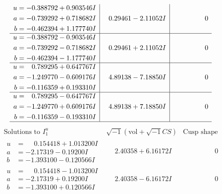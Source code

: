 \documentclass[1p]{elsarticle_modified}
\theoremstyle{definition}
\newcommand{\I}{\sqrt{-1}}
\begin{document}
$$\begin{array}{c|c|c}
\begin{aligned}
u &= -0.388792 + 0.903546 I \\
a &= -0.739292 + 0.718682 I \\
b &= -0.462394 + 1.177740 I\end{aligned}
 & \phantom{-}0.29461 - 2.11052 I & \phantom{-0.000000 } 0 \\ \hline\begin{aligned}
u &= -0.388792 - 0.903546 I \\
a &= -0.739292 - 0.718682 I \\
b &= -0.462394 - 1.177740 I\end{aligned}
 & \phantom{-}0.29461 + 2.11052 I & \phantom{-0.000000 } 0 \\ \hline\begin{aligned}
u &= \phantom{-}0.789295 + 0.647767 I \\
a &= -1.249770 - 0.609176 I \\
b &= -0.116359 + 0.193310 I\end{aligned}
 & \phantom{-}4.89138 - 7.18850 I & \phantom{-0.000000 } 0 \\ \hline\begin{aligned}
u &= \phantom{-}0.789295 - 0.647767 I \\
a &= -1.249770 + 0.609176 I \\
b &= -0.116359 - 0.193310 I\end{aligned}
 & \phantom{-}4.89138 + 7.18850 I & \phantom{-0.000000 } 0\\
 \hline 
 \end{array}$$\newpage$$\begin{array}{c|c|c}  
\text{Solutions to }I^u_{1}& \I (\text{vol} + \sqrt{-1}CS) & \text{Cusp shape}\\
 \hline 
\begin{aligned}
u &= \phantom{-}0.154418 + 1.013200 I \\
a &= -2.17319 - 0.19200 I \\
b &= -1.393100 - 0.120566 I\end{aligned}
 & \phantom{-}2.40358 + 6.16172 I & \phantom{-0.000000 } 0 \\ \hline\begin{aligned}
u &= \phantom{-}0.154418 - 1.013200 I \\
a &= -2.17319 + 0.19200 I \\
b &= -1.393100 + 0.120566 I\end{aligned}
 & \phantom{-}2.40358 - 6.16172 I & \phantom{-0.000000 } 0 \\ \hline\begin{aligned}

\end{aligned}
\end{array}$$
\end{document}
